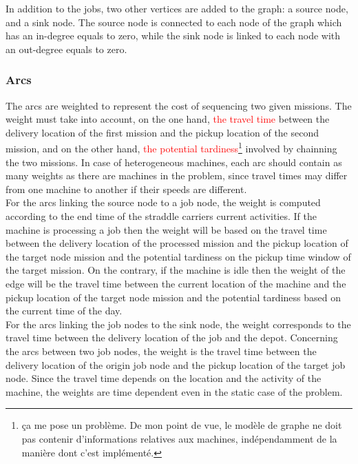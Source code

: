 \documentclass[a4paper,10pt]{article}
\begin{document}
In addition to the jobs, two other vertices are added to the graph: a source node, and a sink node. The source node is connected to each node of the graph which has an in-degree equals to zero, while the sink node is linked to each node with an out-degree equals to zero. %


\subsubsection{Arcs}

The arcs are weighted to represent the cost of sequencing two given missions. The weight must take into account, on the one hand, \textcolor{red}{the travel time} between the delivery location of the first mission and the pickup location of the second mission, and on the other hand, \textcolor{red}{the potential tardiness}\footnote{\c{c}a me pose un probl\`eme. De mon point de vue, le mod\`ele de graphe ne doit pas contenir d'informations relatives aux machines, ind\'ependamment de la mani\`ere dont c'est impl\'ement\'e.} involved by chainning the two missions. In case of heterogeneous machines, each arc should contain as many weights as there are machines in the problem, since travel times may differ from one machine to another if their speeds are different.\\

For the arcs linking the source node to a job node, the weight is computed according to the end time of the straddle carriers current activities. If the machine is processing a job then the weight will be based on the travel time between the delivery location of the processed mission and the pickup location of the target node mission and the potential tardiness on the pickup time window of the target mission. On the contrary, if the machine is idle then the weight of the edge will be the travel time between the current location of the machine and the pickup location of the target node mission and the potential tardiness based on the current time of the day.\\

For the arcs linking the job nodes to the sink node, the weight corresponds to the travel time between the delivery location of the job and the depot. Concerning the arcs between two job nodes, the weight is the travel time between the delivery location of the origin job node and the pickup location of the target job node. Since the travel time depends on the location and the activity of the machine, the weights are time dependent even in the static case of the problem.\\
\end{document}
